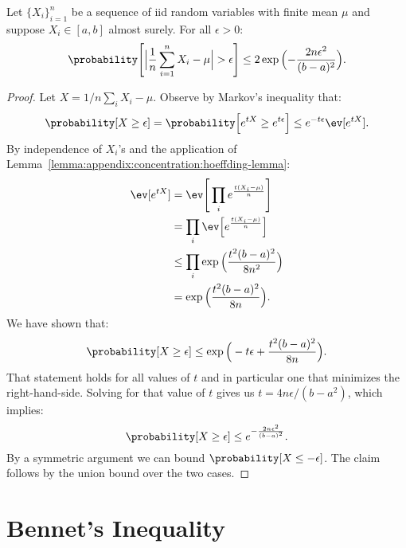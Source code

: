 \begin{lemma}
    Let $\{ X_i \}_{i=1}^n$ be a sequence of iid random variables
    with finite mean $\mu$ and suppose $X_i \in [a, b]$ almost surely.
    For all $\epsilon > 0$:
    \begin{equation*}
        \probability\Bigg[ \Big\lvert \frac{1}{n} \sum_{i=1}^n X_i - \mu \Big\rvert > \epsilon \Bigg] \leq 2 \exp\Big({-\frac{2n \epsilon^2}{(b - a)^2}}\Big).
    \end{equation*}
\end{lemma}
\begin{proof}
    Let $X = 1/n \sum_i X_i - \mu$. Observe by Markov's inequality that:
    \begin{equation*}
        \probability[X \geq \epsilon] = \probability\Big[ e^{tX} \geq e^{t\epsilon} \Big]
        \leq e^{-t\epsilon} \ev[e^{tX}].
    \end{equation*}
    By independence of $X_i$'s and
    the application of Lemma~\ref{lemma:appendix:concentration:hoeffding-lemma}:
    \begin{align*}
        \ev[e^{tX}] &= \ev \Bigg[ \prod_i e^\frac{t(X_i - \mu)}{n} \Bigg] \\
        &= \prod_i \ev \Big[ e^{\frac{t(X_i-\mu)}{n}} \Big] \\
        &\leq \prod_i \exp\Big( \frac{t^2 (b - a)^2}{8 n^2} \Big) \\
        &= \exp\Big( \frac{t^2 (b - a)^2}{8 n} \Big).
    \end{align*}
    We have shown that:
    \begin{equation*}
        \probability[X \geq \epsilon] \leq \exp\Big( -t \epsilon + \frac{t^2 (b - a)^2}{8 n} \Big).
    \end{equation*}
    That statement holds for all values of $t$ and in particular one that minimizes
    the right-hand-side. Solving for that value of $t$ gives us
    $t = 4n\epsilon / (b - a^2)$, which implies:
    \begin{equation*}
        \probability[X \geq \epsilon] \leq e^{-\frac{2n \epsilon^2}{(b - a)^2}}.
    \end{equation*}
    By a symmetric argument we can bound $\probability[X \leq -\epsilon]$. The claim
    follows by the union bound over the two cases.
\end{proof}

\section{Bennet's Inequality}

